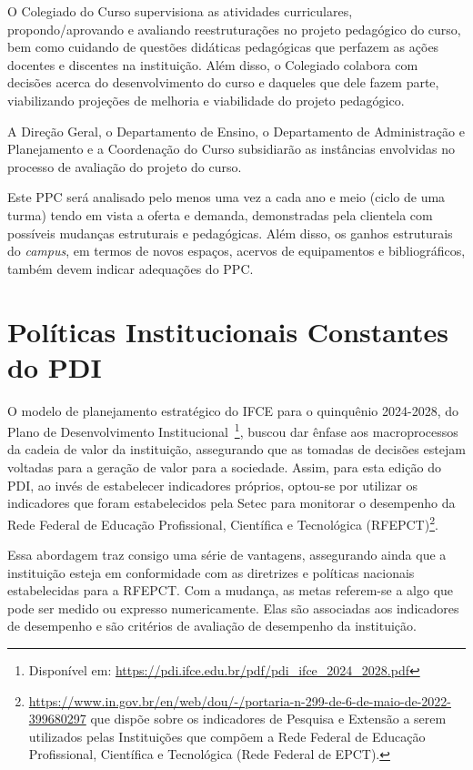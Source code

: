 \documentclass[
	12pt,				%
	openright,			%
	twoside,			%
	a4paper,			%
	chapter=TITLE,		%
	english,			%
	french,				%
	spanish,			%
	brazil,				%
	]{abntex2}
\begin{document}
O Colegiado do Curso supervisiona as atividades curriculares, propondo/aprovando e avaliando reestruturações no projeto pedagógico do curso, bem como cuidando de questões didáticas pedagógicas que perfazem as ações docentes e discentes na instituição. Além disso, o Colegiado colabora com decisões acerca do desenvolvimento do curso e daqueles que dele fazem parte, viabilizando projeções de melhoria e viabilidade do projeto pedagógico.

A Direção Geral, o Departamento de Ensino, o Departamento de Administração e Planejamento e a Coordenação do Curso subsidiarão as instâncias envolvidas no processo de avaliação do projeto do curso.

Este PPC será analisado pelo menos uma vez a cada ano e meio (ciclo de uma turma) tendo em vista a oferta e demanda, 
demonstradas pela clientela com possíveis mudanças estruturais e pedagógicas. Além disso, os ganhos estruturais do \textit{campus}, em termos de novos espaços, acervos de equipamentos e bibliográficos, também devem indicar adequações do PPC.


\chapter{Políticas Institucionais Constantes do PDI}%


O modelo de planejamento estratégico do IFCE para o quinquênio
2024-2028, do Plano de Desenvolvimento Institucional~\footnote{Disponível em:
\url{https://pdi.ifce.edu.br/pdf/pdi_ifce_2024_2028.pdf}}, buscou dar ênfase aos macroprocessos da cadeia de valor da instituição,
assegurando que as tomadas de decisões estejam voltadas para a geração de valor
para a sociedade. Assim, para esta edição do PDI, ao invés de estabelecer indicadores próprios, optou-se
por utilizar os indicadores que foram estabelecidos pela Setec para monitorar o
desempenho da Rede Federal de Educação Profissional, Científica e Tecnológica
(RFEPCT)\footnote{\href{Portaria \N~299, de 06 de maio de 2022}{https://www.in.gov.br/en/web/dou/-/portaria-n-299-de-6-de-maio-de-2022-399680297}
que dispõe sobre os indicadores de Pesquisa e Extensão a serem utilizados pelas
Instituições que compõem a Rede Federal de Educação Profissional, Científica e
Tecnológica (Rede Federal de EPCT).}.


Essa abordagem traz consigo uma série de vantagens, assegurando ainda que a
instituição esteja em conformidade com as diretrizes e políticas nacionais
estabelecidas para a RFEPCT. Com a mudança, as metas  referem-se a algo que pode ser medido ou expresso numericamente. Elas são
associadas aos indicadores de desempenho e são critérios de avaliação de desempenho da instituição.
\end{document}
